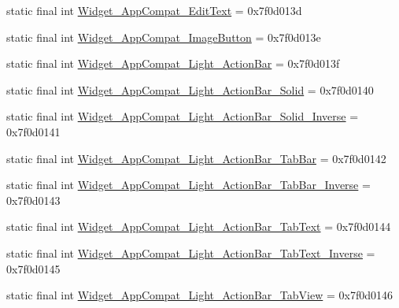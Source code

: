 \begin{DoxyCompactItemize}
\item 
static final int \mbox{\hyperlink{classandroid_1_1support_1_1v7_1_1appcompat_1_1_r_1_1style_a144c07042a4fb9247342c0f30f15e367}{Widget\+\_\+\+App\+Compat\+\_\+\+Edit\+Text}} = 0x7f0d013d
\item 
static final int \mbox{\hyperlink{classandroid_1_1support_1_1v7_1_1appcompat_1_1_r_1_1style_a75769f520cfe5d9066bdf51b5d01ff07}{Widget\+\_\+\+App\+Compat\+\_\+\+Image\+Button}} = 0x7f0d013e
\item 
static final int \mbox{\hyperlink{classandroid_1_1support_1_1v7_1_1appcompat_1_1_r_1_1style_a0dbaf9e73449b6162f7b937d60dcc7f6}{Widget\+\_\+\+App\+Compat\+\_\+\+Light\+\_\+\+Action\+Bar}} = 0x7f0d013f
\item 
static final int \mbox{\hyperlink{classandroid_1_1support_1_1v7_1_1appcompat_1_1_r_1_1style_a8749b52940b38a7fcb284f2cb459a72b}{Widget\+\_\+\+App\+Compat\+\_\+\+Light\+\_\+\+Action\+Bar\+\_\+\+Solid}} = 0x7f0d0140
\item 
static final int \mbox{\hyperlink{classandroid_1_1support_1_1v7_1_1appcompat_1_1_r_1_1style_ab3afe165048e9644abccc3269d0298ae}{Widget\+\_\+\+App\+Compat\+\_\+\+Light\+\_\+\+Action\+Bar\+\_\+\+Solid\+\_\+\+Inverse}} = 0x7f0d0141
\item 
static final int \mbox{\hyperlink{classandroid_1_1support_1_1v7_1_1appcompat_1_1_r_1_1style_a800eec571c7a3a5ae7c9bd34d4de3e2a}{Widget\+\_\+\+App\+Compat\+\_\+\+Light\+\_\+\+Action\+Bar\+\_\+\+Tab\+Bar}} = 0x7f0d0142
\item 
static final int \mbox{\hyperlink{classandroid_1_1support_1_1v7_1_1appcompat_1_1_r_1_1style_a2a321c12e9a90c9c2654c6360a358680}{Widget\+\_\+\+App\+Compat\+\_\+\+Light\+\_\+\+Action\+Bar\+\_\+\+Tab\+Bar\+\_\+\+Inverse}} = 0x7f0d0143
\item 
static final int \mbox{\hyperlink{classandroid_1_1support_1_1v7_1_1appcompat_1_1_r_1_1style_a9a3d404e709ccc4b6451719ce94471a8}{Widget\+\_\+\+App\+Compat\+\_\+\+Light\+\_\+\+Action\+Bar\+\_\+\+Tab\+Text}} = 0x7f0d0144
\item 
static final int \mbox{\hyperlink{classandroid_1_1support_1_1v7_1_1appcompat_1_1_r_1_1style_af00d7bda4d003b15deeea158f097f0d5}{Widget\+\_\+\+App\+Compat\+\_\+\+Light\+\_\+\+Action\+Bar\+\_\+\+Tab\+Text\+\_\+\+Inverse}} = 0x7f0d0145
\item 
static final int \mbox{\hyperlink{classandroid_1_1support_1_1v7_1_1appcompat_1_1_r_1_1style_ac19404a25cb26fbc8d23bca6ce4d090d}{Widget\+\_\+\+App\+Compat\+\_\+\+Light\+\_\+\+Action\+Bar\+\_\+\+Tab\+View}} = 0x7f0d0146
\item 

\end{DoxyCompactItemize}
